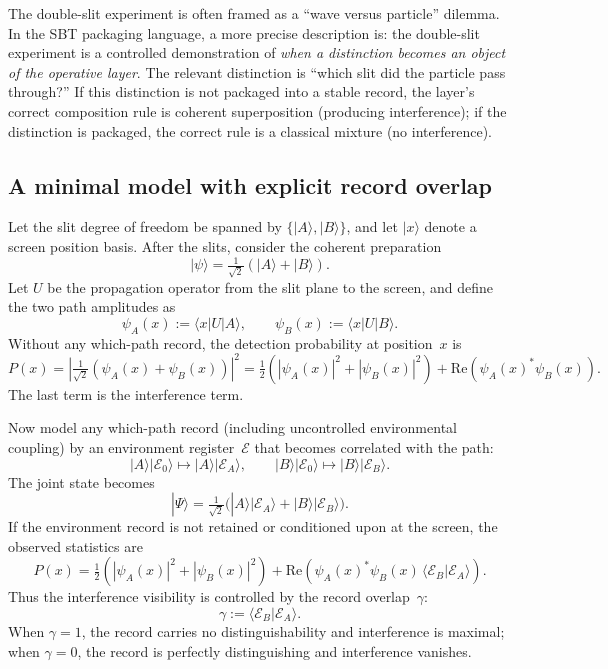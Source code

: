 \documentclass[11pt]{article}
\begin{document}
The double-slit experiment is often framed as a ``wave versus particle'' dilemma.
In the SBT packaging language, a more precise description is: the double-slit experiment is a controlled demonstration of \emph{when a distinction becomes an object of the operative layer}.
The relevant distinction is ``which slit did the particle pass through?''
If this distinction is not packaged into a stable record, the layer's correct composition rule is coherent superposition (producing interference);
if the distinction is packaged, the correct rule is a classical mixture (no interference).

\subsection{A minimal model with explicit record overlap}

Let the slit degree of freedom be spanned by $\{|A\rangle,|B\rangle\}$, and let $|x\rangle$ denote a screen position basis.
After the slits, consider the coherent preparation
\[
|\psi\rangle = \tfrac{1}{\sqrt2}\left(|A\rangle + |B\rangle\right).
\]
Let $U$ be the propagation operator from the slit plane to the screen, and define the two path amplitudes as
\[
\psi_A(x) := \langle x|U|A\rangle,\qquad \psi_B(x) := \langle x|U|B\rangle.
\]
Without any which-path record, the detection probability at position~$x$ is
\[
P(x) = \left|\tfrac{1}{\sqrt2}(\psi_A(x)+\psi_B(x))\right|^2
     = \tfrac12\left(|\psi_A(x)|^2+|\psi_B(x)|^2\right)
       + \mathrm{Re}\!\left(\psi_A(x)^\ast\psi_B(x)\right).
\]
The last term is the interference term.

Now model any which-path record (including uncontrolled environmental coupling) by an environment register~$\mathcal{E}$ that becomes correlated with the path:
\[
|A\rangle|\mathcal{E}_0\rangle \mapsto |A\rangle|\mathcal{E}_A\rangle,\qquad
|B\rangle|\mathcal{E}_0\rangle \mapsto |B\rangle|\mathcal{E}_B\rangle.
\]
The joint state becomes
\[
|\Psi\rangle=\tfrac{1}{\sqrt2}\big(|A\rangle|\mathcal{E}_A\rangle + |B\rangle|\mathcal{E}_B\rangle\big).
\]
If the environment record is not retained or conditioned upon at the screen, the observed statistics are
\[
P(x)=\tfrac12\left(|\psi_A(x)|^2+|\psi_B(x)|^2\right)
+\mathrm{Re}\!\left(\psi_A(x)^\ast\psi_B(x)\,\langle \mathcal{E}_B|\mathcal{E}_A\rangle\right).
\]
Thus the interference visibility is controlled by the record overlap~$\gamma$:\cite{Englert1996Visibility}
\[
\gamma := \langle \mathcal{E}_B|\mathcal{E}_A\rangle.
\]
When $\gamma=1$, the record carries no distinguishability and interference is maximal; when $\gamma=0$, the record is perfectly distinguishing and interference vanishes.
\end{document}
